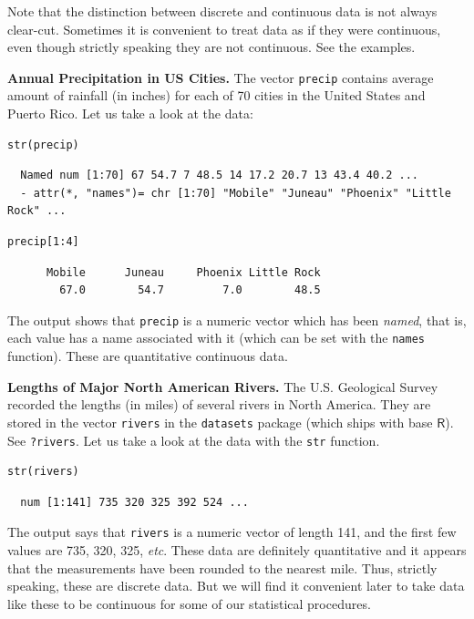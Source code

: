 \documentclass[captions=tableheading]{scrbook}
\begin{document}
Note that the distinction between discrete and continuous data is not always clear-cut. Sometimes it is convenient to treat data as if they were continuous, even though strictly speaking they are not continuous. See the examples.

\begin{example}
\textbf{Annual Precipitation in US Cities.} The vector \texttt{precip} contains average amount of rainfall (in inches) for each of 70 cities in the United States and Puerto Rico. Let us take a look at the data:


\lstset{language=R}
\begin{lstlisting}
str(precip)
\end{lstlisting}

\begin{verbatim}
  Named num [1:70] 67 54.7 7 48.5 14 17.2 20.7 13 43.4 40.2 ...
  - attr(*, "names")= chr [1:70] "Mobile" "Juneau" "Phoenix" "Little Rock" ...
\end{verbatim}


\lstset{language=R}
\begin{lstlisting}
precip[1:4]
\end{lstlisting}

\begin{verbatim}
      Mobile      Juneau     Phoenix Little Rock 
        67.0        54.7         7.0        48.5
\end{verbatim}

The output shows that \texttt{precip} is a numeric vector which has been \emph{named}, that is, each value has a name associated with it (which can be set with the \texttt{names} function). These are quantitative continuous data.

\end{example}

\begin{example}
\textbf{Lengths of Major North American Rivers.} The U.S. Geological Survey recorded the lengths (in miles) of several rivers in North America. They are stored in the vector \texttt{rivers} in the \texttt{datasets} package (which ships with base \(\mathsf{R}\)). See \texttt{?rivers}. Let us take a look at the data with the \texttt{str} function.


\lstset{language=R}
\begin{lstlisting}
str(rivers)
\end{lstlisting}

\begin{verbatim}
  num [1:141] 735 320 325 392 524 ...
\end{verbatim}

The output says that \texttt{rivers} is a numeric vector of length 141, and the first few values are 735, 320, 325, \emph{etc}. These data are definitely quantitative and it appears that the measurements have been rounded to the nearest mile. Thus, strictly speaking, these are discrete data. But we will find it convenient later to take data like these to be continuous for some of our statistical procedures. 
\end{example}
\end{document}
